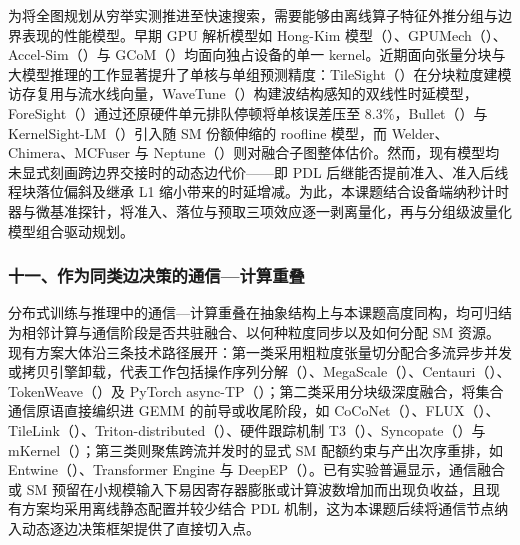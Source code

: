 为将全图规划从穷举实测推进至快速搜索，需要能够由离线算子特征外推分组与边界表现的性能模型。早期 GPU 解析模型如 Hong-Kim 模型（）、GPUMech（）、Accel-Sim（）与 GCoM（）均面向独占设备的单一 kernel。近期面向张量分块与大模型推理的工作显著提升了单核与单组预测精度：TileSight（）在分块粒度建模访存复用与流水线向量，WaveTune（）构建波结构感知的双线性时延模型，ForeSight（）通过还原硬件单元排队停顿将单核误差压至 8.3\%，Bullet（）与 KernelSight-LM（）引入随 SM 份额伸缩的 roofline 模型，而 Welder、Chimera、MCFuser 与 Neptune（）则对融合子图整体估价。然而，现有模型均未显式刻画跨边界交接时的动态边代价——即 PDL 后继能否提前准入、准入后线程块落位偏斜及继承 L1 缩小带来的时延增减。为此，本课题结合设备端纳秒计时器与微基准探针，将准入、落位与预取三项效应逐一剥离量化，再与分组级波量化模型组合驱动规划。

\subsubsection*{十一、作为同类边决策的通信—计算重叠}

分布式训练与推理中的通信—计算重叠在抽象结构上与本课题高度同构，均可归结为相邻计算与通信阶段是否共驻融合、以何种粒度同步以及如何分配 SM 资源。现有方案大体沿三条技术路径展开：第一类采用粗粒度张量切分配合多流异步并发或拷贝引擎卸载，代表工作包括操作序列分解（）、MegaScale（）、Centauri（）、TokenWeave（）及 PyTorch async-TP（）；第二类采用分块级深度融合，将集合通信原语直接编织进 GEMM 的前导或收尾阶段，如 CoCoNet（）、FLUX（）、TileLink（）、Triton-distributed（）、硬件跟踪机制 T3（）、Syncopate（）与 mKernel（）；第三类则聚焦跨流并发时的显式 SM 配额约束与产出次序重排，如 Entwine（）、Transformer Engine 与 DeepEP（）。已有实验普遍显示，通信融合或 SM 预留在小规模输入下易因寄存器膨胀或计算波数增加而出现负收益，且现有方案均采用离线静态配置并较少结合 PDL 机制，这为本课题后续将通信节点纳入动态逐边决策框架提供了直接切入点。

